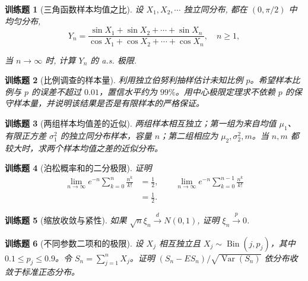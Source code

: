 \documentclass[UTF8,12pt,a4paper,fontset=fandol]{ctexbook}
\newtheorem{exercise}{训练题}[section]
\begin{document}
\begin{exercise}[三角函数样本均值之比]\label{q:A7.10}
设 $X_1,X_2,\cdots$ 独立同分布, 都在 $(0,\pi/2)$ 中均匀分布,
    \[Y_n=\dfrac{\sin X_1+\sin X_2+\cdots+\sin X_n}{\cos X_1+\cos X_2+\cdots+\cos X_n},\quad n\geq1,\]
    
    当 $n\to\infty$ 时, 计算 $Y_n$ 的 a.s. 极限.\par{}\end{exercise}

\begin{exercise}[比例调查的样本量]\label{q:A7.14}
利用独立伯努利抽样估计未知比例 $p$。希望样本比例与 $p$ 的误差不超过 $0.01$，置信水平约为 $99\%$。用中心极限定理求不依赖 $p$ 的保守样本量，并说明该结果是否是有限样本的严格保证。\par{}\end{exercise}

\begin{exercise}[两组样本均值差的近似]\label{q:A7.15}
两组样本相互独立；第一组为来自均值 $\mu_1$、有限正方差 $\sigma_1^2$ 的独立同分布样本，容量 $n$；第二组相应为 $\mu_2,\sigma_2^2,m$。当 $n,m$ 都较大时，求两个样本均值之差的近似分布。\par{}\end{exercise}

\begin{exercise}[泊松概率和的二分极限]\label{q:A7.20}
证明\[\begin{aligned}\lim_{n\to\infty}e^{-n}\sum_{k=0}^{n}\frac{n^k}{k!}&=\frac12,\qquad\lim_{n\to\infty}e^{-n}\sum_{k=0}^{n-1}\frac{n^k}{k!}\\&=\frac12.\end{aligned}\]\par{}\end{exercise}

\begin{exercise}[缩放收敛与紧性]\label{q:A7.21}
如果 $\sqrt{n}\xi_n\xrightarrow{d}N(0,1)$, 证明 $\xi_n\xrightarrow{p}0$.\par{}\end{exercise}

\begin{exercise}[不同参数二项和的极限]\label{q:A7.22}
设 $X_j$ 相互独立且 $X_j\sim\operatorname{Bin}(j,p_j)$，其中 $0.1\le p_j\le0.9$。令 $S_n=\sum_{j=1}^nX_j$。证明 $(S_n-ES_n)/\sqrt{\operatorname{Var}(S_n)}$ 依分布收敛于标准正态分布。\par{}\end{exercise}
\end{document}
